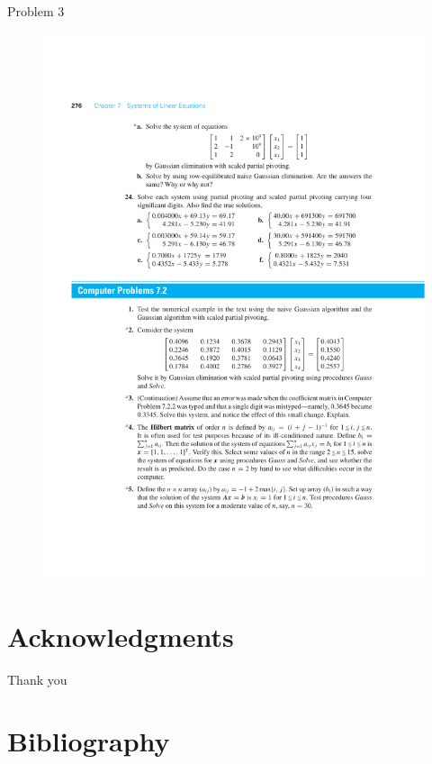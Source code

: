 \documentclass[xcolor=svgnames,t,10pt,allowframebreaks]{beamer}
\begin{document}
\begin{frame}[label={sec:org6a826ca}]{Problem 3 \cite{cheney2012numerical}}
\vfill
\begin{figure}[H]

\includegraphics[width=1.0\textwidth]{fig/problem-02.pdf}
\end{figure}
\vfill
\end{frame}

\section*{Acknowledgments}
\label{sec:org0960aa4}
\begin{frame}[standout,label=]{}
Thank you
\end{frame}

\section{Bibliography}
\label{sec:org9dfe073}

 
\cite{*}
\end{document}
